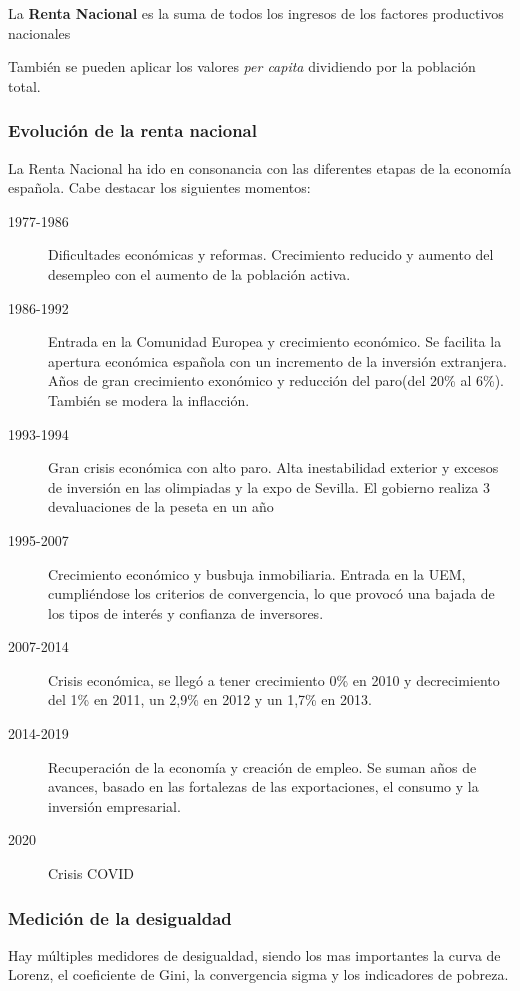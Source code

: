     La \textbf{Renta Nacional} es la suma de todos los ingresos de los factores productivos nacionales

    También se pueden aplicar los valores \textit{per capita} dividiendo por la población total.

    \subsubsection{Evolución de la renta nacional}
        La Renta Nacional ha ido en consonancia con las diferentes etapas de la economía española. Cabe destacar los siguientes momentos:

        \begin{description}
            \item[1977-1986] Dificultades económicas y reformas. Crecimiento reducido y aumento del desempleo con el aumento de la población activa.
            \item[1986-1992] Entrada en la Comunidad Europea y crecimiento económico. Se facilita la apertura económica española con un incremento de la inversión extranjera. Años de gran crecimiento exonómico y reducción del paro(del 20\% al 6\%). También se modera la inflacción.
            \item[1993-1994] Gran crisis económica con alto paro. Alta inestabilidad exterior y excesos de inversión en las olimpiadas y la expo de Sevilla. El gobierno realiza 3 devaluaciones de la peseta en un año
            \item[1995-2007] Crecimiento económico y busbuja inmobiliaria. Entrada en la UEM, cumpliéndose los criterios de convergencia, lo que provocó una bajada de los tipos de interés y confianza de inversores.
            \item[2007-2014] Crisis económica, se llegó a tener crecimiento 0\% en 2010 y decrecimiento del 1\% en 2011, un 2,9\% en 2012 y un 1,7\% en 2013.
            \item[2014-2019] Recuperación de la economía y creación de empleo. Se suman años de avances, basado en las fortalezas de las exportaciones, el consumo y la inversión empresarial.
            \item[2020] Crisis COVID 
        \end{description}

    \subsubsection{Medición de la desigualdad}
        Hay múltiples medidores de desigualdad, siendo los mas importantes la curva de Lorenz, el coeficiente de Gini, la convergencia sigma y los indicadores de pobreza.

